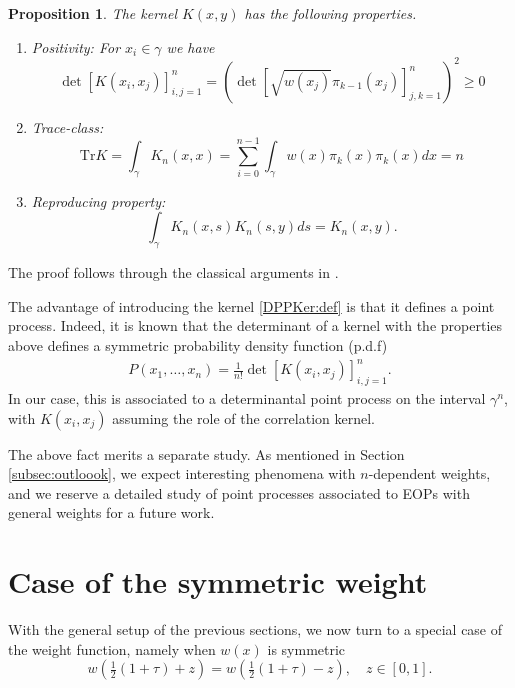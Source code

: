 \documentclass[11pt,a4paper]{article}
\newtheorem{proposition}[theorem]{Proposition}
\theoremstyle{definition}
\numberwithin{equation}{section}
\numberwithin{theorem}{section}
\newcommand{\myrmk}[2]{\begin{quote}\fbox{\begin{minipage}{\linewidth}\small \noindent{\color{red}\bf #2:} #1{\color{red}}\end{minipage}}\end{quote}}
\newcommand{\rmkH}[1]{\myrmk{#1}{HD}}
\newcommand{\rmkS}[1]{\myrmk{#1}{SL}}
\begin{document}
\begin{proposition} The kernel $K(x,y)$ has the following properties.
    \begin{enumerate}
        \item Positivity: For $x_{i}\in \gamma$ we have
    \begin{equation}
        \det [K(x_i,x_j)]_{i,j=1}^{n}= \left(\det \left[\sqrt{w(x_j)}\pi_{k-1}(x_j)\right]_{j,k=1}^{n}\right)^2\geq 0 
    \end{equation}
    \item Trace-class: $$\mathrm{Tr} K = \int_{\gamma}K_{n}(x,x)=\sum_{i=0}^{n-1}\int_{\gamma}w(x)\pi_{k}(x)\pi_{k}(x)dx=n$$
    \item Reproducing property:$$\int_{\gamma}K_{n}(x,s)K_n(s,y)ds=K_n(x,y).$$
 \end{enumerate}
\end{proposition}
The proof follows through the classical arguments in \cite{forrester2010log}.



The advantage of introducing the kernel \eqref{DPPKer:def} is that it defines a point process. Indeed, it is known that the determinant of a kernel with the properties above defines a symmetric probability density function (p.d.f)
\begin{align}\label{eq:pdf}
    P(x_1,\dots, x_n) = \frac{1}{n!} \det\left[K(x_i, x_j) \right]_{i,j=1}^{n}.
\end{align}
In our case, this is associated to a determinantal point process on the interval $\gamma^n$, with $K(x_i,x_j)$ assuming the role of the correlation kernel. 

The above fact merits a separate study. As mentioned in Section \ref{subsec:outloook}, we expect interesting phenomena with $n$-dependent weights, and we reserve a detailed study of point processes associated to EOPs with general weights for a future work.


\section{Case of the symmetric weight}\label{sec:symm-weight}
With the general setup of the previous sections, we now turn to a special case of the weight function, namely when $w(x)$ is symmetric 
\begin{equation}\label{eq:even_weight}
    {w}\left(\tfrac{1}{2}(1+\tau) + z\right) = {w}\left(\tfrac{1}{2}(1+\tau) - z\right), \quad z \in [0,1].
\end{equation}
\end{document}
